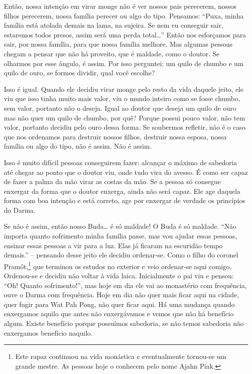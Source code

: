 Então, nossa intenção em virar monge não é ver nossos pais
perecerem, nossos filhos perecerem, nossa família perecer ou algo do
tipo. Pensamos: “Puxa, minha família está atolada demais na lama, na
sujeira. Se nem eu conseguir sair, estaremos todos presos, assim será
uma perda total\ldots{}” Então nos esforçamos para sair, por nossa família,
para que nossa família melhore. Mas algumas pessoas chegam a pensar que
não há proveito, que é maldade, como o doutor. Se olharmos por esse
ângulo, é assim. Por isso perguntei: um quilo de chumbo e um quilo de
ouro, se formos dividir, qual você escolhe? 

Isso é igual. Quando ele decidiu virar monge pelo resto da vida
daquele jeito, ele viu que isso tinha muito mais valor, viu o mundo
inteiro como se fosse chumbo, sem valor, portanto não o deseja. Igual
ao doutor que deseja um quilo de ouro mas não quer um quilo de chumbo,
por quê? Porque possui pouco valor, não tem valor, portanto decidiu
pelo ouro dessa forma. Se soubermos refletir, não é o caso que nos
ordenamos para destruir nossos filhos, destruir nossa esposa, nossa
família ou algo do tipo, não é assim. Não é assim.

Isso é muito difícil pessoas conseguirem fazer: alcançar o máximo de
sabedoria até chegar ao ponto que o doutor viu, onde tudo vira do
avesso. É como ser capaz de fazer a palma da mão virar as costas da
mão. Se a pessoa só consegue enxergar da forma que o doutor enxerga,
ainda não será capaz. Ele age daquela forma com boa intenção e está
correto, age por enxergar de verdade os princípios do Darma. 

Se não é assim, então nosso Buda\ldots{} é só maldade! O Buda é só maldade.
“Não importa quanto sofrimento minha família passe, mas vou ajudar
essas pessoas, ensinar essas pessoas a vir para a luz. Elas já ficaram
na escuridão tempo demais.” – pensando desse jeito ele decidiu
ordenar-se. Como o filho do coronel Pramôt,\footnote{Este rapaz
continuou na vida monástica e eventualmente tornou-se um grande mestre.
As pessoas hoje o conhecem pelo nome Ajahn Piak.} que terminou os
estudos no exterior e veio ordenar-se aqui comigo. Ordenou-se e decidiu
não voltar à vida laica. Inicialmente o pai viu e pensou: “Oh! Quanto
sofrimento!”, mas hoje em dia ele vai ao monastério com frequência,
ouve o Darma com frequência. Hoje em dia não quer mais ficar aqui na
cidade, quer fugir para Wat Pah Pong, não quer ficar aqui. Há uma
mudança quando enxergamos aquilo que antes não enxergávamos e vemos que
não há benefício algum. Existe benefício porque possuímos sabedoria, se
não temos sabedoria não enxergamos benefício naquilo. 


